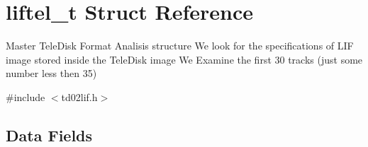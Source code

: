 \hypertarget{structliftel__t}{}\section{liftel\+\_\+t Struct Reference}
\label{structliftel__t}


Master Tele\+Disk Format Analisis structure We look for the specifications of L\+IF image stored inside the Tele\+Disk image We Examine the first 30 tracks (just some number less then 35)  




{\ttfamily \#include $<$td02lif.\+h$>$}

\subsection*{Data Fields}
